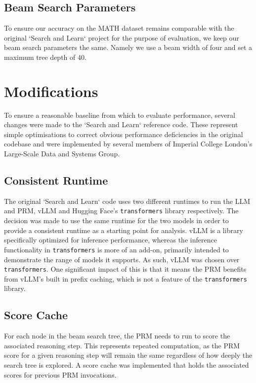 \documentclass[11pt,twoside]{report}
\begin{document}
\subsection{Beam Search Parameters}
To ensure our accuracy on the MATH dataset remains comparable with the original `Search and Learn` project for the purpose of evaluation, we keep our beam search parameters the same.
Namely we use a beam width of four and set a maximum tree depth of 40.

\section{Modifications}
To ensure a reasonable baseline from which to evaluate performance, several changes were made to the `Search and Learn` reference code.
These represent simple optimisations to correct obvious performance deficiencies in the original codebase and were implemented by several members of Imperial College London's Large-Scale Data and Systems Group.

\subsection{Consistent Runtime} 
The original `Search and Learn` code uses two different runtimes to run the LLM and PRM, vLLM and Hugging Face's \texttt{transformers} library \cite{kwon2023efficient} \cite{wolf2019huggingface} respectively.
The decision was made to use the same runtime for the two models in order to provide a consistent runtime as a starting point for analysis.
vLLM is a library specifically optimized for inference performance, whereas the inference functionality in \texttt{transformers} is more of an add-on, primarily intended to demonstrate the range of models it supports.
As such, vLLM was chosen over \texttt{transformers}.
One significant impact of this is that it means the PRM benefits from vLLM's built in prefix caching, which is not a feature of the \texttt{transformers} library.

\subsection{Score Cache}
For each node in the beam search tree, the PRM needs to run to score the associated reasoning step.
This represents repeated computation, as the PRM score for a given reasoning step will remain the same regardless of how deeply the search tree is explored.
A score cache was implemented that holds the associated scores for previous PRM invocations.
\end{document}
